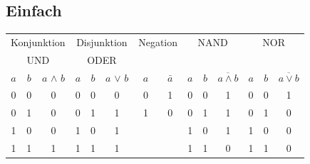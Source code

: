 \documentclass[12pt, a4paper, twopage]{scrartcl}
\begin{document}
\subsection{Einfach}
\begin{center}
\begin{tabular}[c]{c | c | c || c| c | c || c | c || c | c | c || c| c| c}
\multicolumn{3}{c||}{Konjunktion}	&	\multicolumn{3}{c||}{Disjunktion} & \multicolumn{2}{c||}{Negation} & \multicolumn{3}{c||}{NAND} & \multicolumn{3}{c}{NOR}\\
\multicolumn{3}{c||}{UND}	&	\multicolumn{3}{c||}{ODER} & \multicolumn{2}{c||}{} & \multicolumn{3}{c||}{} & \multicolumn{3}{c}{}\\
\hline
$a$ & $b$ & $a$ $\wedge$ $b$ & $a$ & $b$ & $a$ $\vee$ $b$ & $a$ & $\bar{a}$ & $a$ & $b$ & $\overline{a \wedge b}$ & $a$ & $b$ & $\overline{a \vee b}$\\
\hline
0 & 0 & 0 & 0 & 0 & 0 & 0 & 1 & 0 & 0 & 1 & 0 & 0 & 1\\
0 & 1 & 0 & 0 & 1 & 1 & 1 & 0 & 0 & 1 & 1 & 0 & 1 & 0\\
1 & 0 & 0 & 1 & 0 & 1 & & & 1 & 0 & 1 & 1 & 0 & 0\\
1 & 1 & 1 & 1 & 1 & 1 & & & 1 & 1 & 0 & 1 & 1 & 0\\
\hline
\end{tabular}
\end{center}
\end{document}
